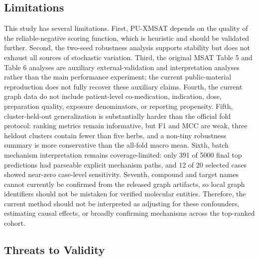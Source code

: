 \documentclass[manuscript,screen,review]{acmart}
\newcommand{\msat}{MSAT}
\newcommand{\px}{PU-XMSAT}
\begin{document}
\subsection{Limitations}

This study has several limitations. First, \px{} depends on the quality of the reliable-negative scoring function, which is heuristic and should be validated further. Second, the two-seed robustness analysis supports stability but does not exhaust all sources of stochastic variation. Third, the original \msat{} Table 5 and Table 6 analyses are auxiliary external-validation and interpretation analyses rather than the main performance experiment; the current public-material reproduction does not fully recover these auxiliary claims. Fourth, the current graph data do not include patient-level co-medication, indication, dose, preparation quality, exposure denominators, or reporting propensity. Fifth, cluster-held-out generalization is substantially harder than the official fold protocol: ranking metrics remain informative, but F1 and MCC are weak, three heldout clusters contain fewer than five herbs, and a non-tiny robustness summary is more conservative than the all-fold macro mean. Sixth, batch mechanism interpretation remains coverage-limited: only 391 of 5000 final top predictions had parseable explicit mechanism paths, and 12 of 20 selected cases showed near-zero case-level sensitivity. Seventh, compound and target names cannot currently be confirmed from the released graph artifacts, so local graph identifiers should not be mistaken for verified molecular entities. Therefore, the current method should not be interpreted as adjusting for these confounders, estimating causal effects, or broadly confirming mechanisms across the top-ranked cohort.

\subsection{Threats to Validity}
\end{document}
